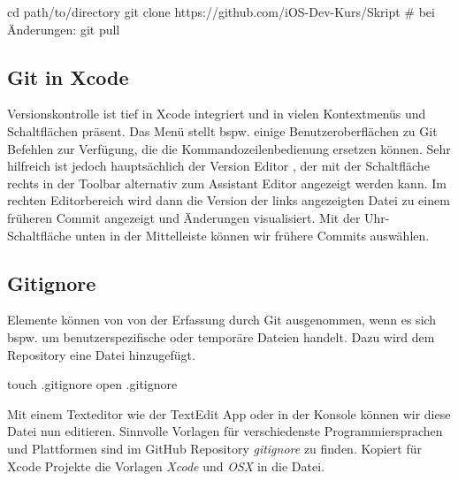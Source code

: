 \documentclass[parskip=half, final]{scrreprt}
\begin{document}
\begin{shlst}
cd path/to/directory
git clone https://github.com/iOS-Dev-Kurs/Skript
# bei Änderungen:
git pull
\end{shlst}

\subsection{Git in Xcode} 

Versionskontrolle ist tief in Xcode integriert und in vielen Kontextmenüs und Schaltflächen präsent. Das Menü  stellt bspw. einige Benutzeroberflächen zu Git Befehlen zur Verfügung, die die Kommandozeilenbedienung ersetzen können. Sehr hilfreich ist jedoch hauptsächlich der Version Editor , der mit der Schaltfläche rechts in der Toolbar alternativ zum Assistant Editor angezeigt werden kann. Im rechten Editorbereich wird dann die Version der links angezeigten Datei zu einem früheren Commit angezeigt und Änderungen visualisiert. Mit der Uhr-Schaltfläche unten in der Mittelleiste können wir frühere Commits auswählen.


\subsection{Gitignore}

Elemente können von von der Erfassung durch Git ausgenommen, wenn es sich bspw. um benutzerspezifische oder temporäre Dateien handelt. Dazu wird dem Repository eine  Datei hinzugefügt.

\begin{shlst}
touch .gitignore
open .gitignore
\end{shlst}

Mit einem Texteditor wie der TextEdit App oder  in der Konsole können wir diese Datei nun editieren. Sinnvolle Vorlagen für verschiedenste Programmiersprachen und Plattformen sind im GitHub Repository \emph{gitignore}  zu finden. Kopiert für Xcode Projekte die Vorlagen \emph{Xcode}  und \emph{OSX}  in die  Datei.
\end{document}
